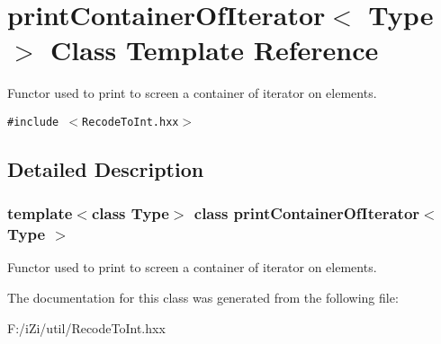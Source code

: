 \section{print\-Container\-Of\-Iterator$<$ Type $>$ Class Template Reference}
\label{classprint_container_of_iterator}
Functor used to print to screen a container of iterator on elements.  


{\tt \#include $<$Recode\-To\-Int.hxx$>$}



\subsection{Detailed Description}
\subsubsection*{template$<$class Type$>$ class print\-Container\-Of\-Iterator$<$ Type $>$}

Functor used to print to screen a container of iterator on elements. 



The documentation for this class was generated from the following file:\begin{CompactItemize}
\item 
F:/i\-Zi/util/Recode\-To\-Int.hxx\end{CompactItemize}
